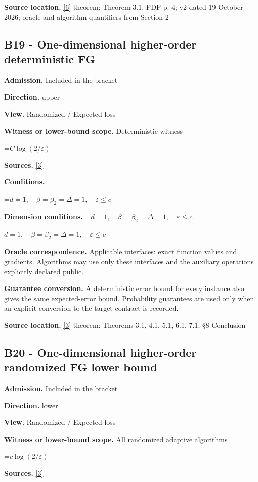 \documentclass[10pt,a4paper]{article}
\newcommand{\AtlasMath}[1]{\par\begingroup\centering\setbox0=\hbox{$\displaystyle #1$}\ifdim\wd0>1.4\linewidth\typeout{ATLAS WIDE FORMULA: \the\wd0}\fi\ifdim\wd0>\linewidth\resizebox{\linewidth}{!}{\box0}\else\box0\fi\par\endgroup}
\newcommand{\AtlasInlineMath}[1]{\begingroup\setbox0=\hbox{$#1$}\ifdim\wd0>.4\linewidth\endgroup\AtlasMath{#1}\else\endgroup$#1$\fi}
\begin{document}
\textbf{Source location.} \href{https://arxiv.org/pdf/2610.00245v2}{[6]} theorem: Theorem 3.1, PDF p. 4; v2 dated 19 October 2026; oracle and algorithm quantifiers from Section 2

\subsection{B19 - One-dimensional higher-order deterministic FG}
\textbf{Admission.} Included in the bracket

\textbf{Direction.} upper

\textbf{View.} Randomized / Expected loss

\textbf{Witness or lower-bound scope.} Deterministic witness

\AtlasMath{C\log(2/\varepsilon)}
\textbf{Sources.} \href{https://arxiv.org/abs/2610.16295}{[3]}

\textbf{Conditions.} 
\AtlasMath{d=1,\quad\beta=\beta_2=\Delta=1,\quad\varepsilon\le c}


\textbf{Dimension conditions.} \AtlasInlineMath{d=1,\quad\beta=\beta_2=\Delta=1,\quad\varepsilon\le c}

\textbf{Oracle correspondence.} Applicable interfaces: exact function values and gradients. Algorithms may use only these interfaces and the auxiliary operations explicitly declared public.

\textbf{Guarantee conversion.} A deterministic error bound for every instance also gives the same expected-error bound. Probability guarantees are used only when an explicit conversion to the target contract is recorded.

\textbf{Source location.} \href{https://arxiv.org/abs/2610.16295}{[3]} theorem: Theorems 3.1, 4.1, 5.1, 6.1, 7.1; §8 Conclusion

\subsection{B20 - One-dimensional higher-order randomized FG lower bound}
\textbf{Admission.} Included in the bracket

\textbf{Direction.} lower

\textbf{View.} Randomized / Expected loss

\textbf{Witness or lower-bound scope.} All randomized adaptive algorithms

\AtlasMath{c\log(2/\varepsilon)}
\textbf{Sources.} \href{https://arxiv.org/abs/2610.16295}{[3]}
\end{document}
